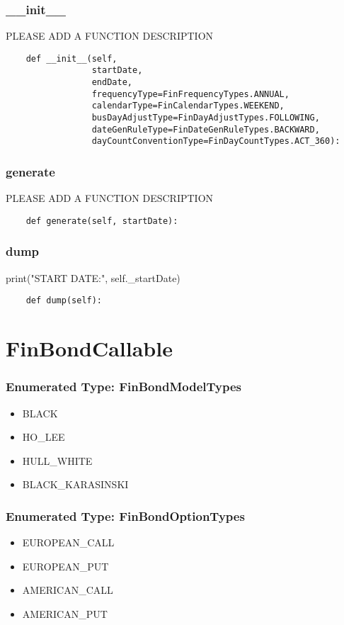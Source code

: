 \documentclass[twoside,11pt]{book}
\begin{document}
\subsubsection*{{\bf \_\_init\_\_}}
PLEASE ADD A FUNCTION DESCRIPTION

\begin{lstlisting}
    def __init__(self,
                 startDate,
                 endDate,
                 frequencyType=FinFrequencyTypes.ANNUAL,
                 calendarType=FinCalendarTypes.WEEKEND,
                 busDayAdjustType=FinDayAdjustTypes.FOLLOWING,
                 dateGenRuleType=FinDateGenRuleTypes.BACKWARD,
                 dayCountConventionType=FinDayCountTypes.ACT_360):
\end{lstlisting}

\subsubsection*{{\bf generate}}
PLEASE ADD A FUNCTION DESCRIPTION

\begin{lstlisting}
    def generate(self, startDate):
\end{lstlisting}

\subsubsection*{{\bf dump}}
print("START DATE:", self.\_startDate) 

\begin{lstlisting}
    def dump(self):
\end{lstlisting}

\newpage
\section{FinBondCallable}

\subsubsection{Enumerated Type: FinBondModelTypes}
\begin{itemize}
\item{BLACK}
\item{HO\_LEE}
\item{HULL\_WHITE}
\item{BLACK\_KARASINSKI}
\end{itemize}

\subsubsection{Enumerated Type: FinBondOptionTypes}
\begin{itemize}
\item{EUROPEAN\_CALL}
\item{EUROPEAN\_PUT}
\item{AMERICAN\_CALL}
\item{AMERICAN\_PUT}
\end{itemize}
\end{document}

